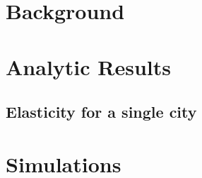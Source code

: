 \documentclass[hidelinks,preprint,12pt]{elsarticle}
\begin{document}
\section{Background}\label{sec:Background}



\section{Analytic Results}\label{sec:analytic}


\subsection{Elasticity for a single city}
\label{ch:betasingle}


\section{Simulations}\label{sec:simulation}



\end{document}
